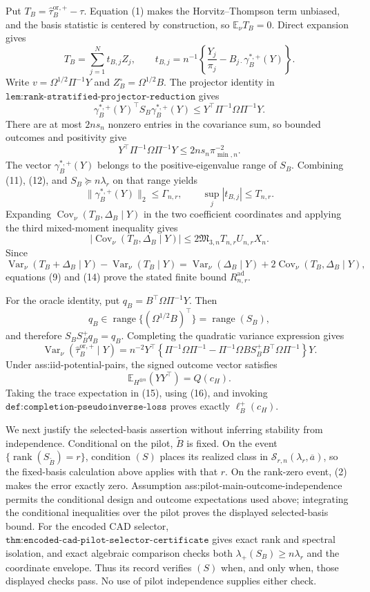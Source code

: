 Put \(T_B=\widehat\tau_B^{\mathrm{or},+}-\tau\).  Equation (1) makes the Horvitz--Thompson term unbiased, and the basis statistic is centered by construction, so \(\mathbb E_\nu T_B=0\).  Direct expansion gives
\[
T_B=\sum_{j=1}^{N}t_{B,j}Z_j,
\qquad
t_{B,j}=n^{-1}\left\{\frac{Y_j}{\pi_j}
-B_{j\cdot}\gamma_B^{*,+}(Y)\right\}.
\tag{10}
\]
Write \(v=\Omega^{1/2}\Pi^{-1}Y\) and \(Z_B^\circ=\Omega^{1/2}B\).  The projector identity in \(\texttt{lem:rank-stratified-projector-reduction}\) gives
\[
\gamma_B^{*,+}(Y)^{\top}S_B\gamma_B^{*,+}(Y)
\le Y^{\top}\Pi^{-1}\Omega\Pi^{-1}Y.
\tag{11}
\]
There are at most \(2ns_n\) nonzero entries in the covariance sum, so bounded outcomes and positivity give
\[
Y^{\top}\Pi^{-1}\Omega\Pi^{-1}Y
\le2ns_n\pi_{\min,n}^{-2}.
\tag{12}
\]
The vector \(\gamma_B^{*,+}(Y)\) belongs to the positive-eigenvalue range of \(S_B\).  Combining (11), (12), and \(S_B\succeq n\lambda_r\) on that range yields
\[
\lVert\gamma_B^{*,+}(Y)\rVert_2\le\Gamma_{n,r},
\qquad
\sup_j|t_{B,j}|\le T_{n,r}.
\tag{13}
\]
Expanding \(\operatorname{Cov}_\nu(T_B,\Delta_B\mid Y)\) in the two coefficient coordinates and applying the third mixed-moment inequality gives
\[
|\operatorname{Cov}_\nu(T_B,\Delta_B\mid Y)|
\le2\mathfrak M_{3,n}T_{n,r}U_{n,r}X_n.
\tag{14}
\]
Since
\[
\operatorname{Var}_\nu(T_B+\Delta_B\mid Y)-\operatorname{Var}_\nu(T_B\mid Y)
=\operatorname{Var}_\nu(\Delta_B\mid Y)
+2\operatorname{Cov}_\nu(T_B,\Delta_B\mid Y),
\]
equations (9) and (14) prove the stated finite bound \(R_{n,r}^{\mathrm{ad}}\).

For the oracle identity, put \(q_B=B^{\top}\Omega\Pi^{-1}Y\).  Then
\[
q_B\in\operatorname{range}\{(\Omega^{1/2}B)^{\top}\}
=\operatorname{range}(S_B),
\]
and therefore \(S_BS_B^+q_B=q_B\).  Completing the quadratic variance expression gives
\[
\operatorname{Var}_\nu(\widehat\tau_B^{\mathrm{or},+}\mid Y)
=n^{-2}Y^{\top}\left\{\Pi^{-1}\Omega\Pi^{-1}
-\Pi^{-1}\Omega B S_B^+B^{\top}\Omega\Pi^{-1}\right\}Y.
\tag{15}
\]
Under ass:iid-potential-pairs, the signed outcome vector satisfies
\[
\mathbb E_{H^{\otimes n}}(YY^{\top})=Q(c_H).
\tag{16}
\]
Taking the trace expectation in (15), using (16), and invoking \(\texttt{def:completion-pseudoinverse-loss}\) proves exactly \(\ell_B^+(c_H)\).

We next justify the selected-basis assertion without inferring stability from independence.  Conditional on the pilot, \(\widetilde B\) is fixed.  On the event \(\{\operatorname{rank}(S_{\widetilde B})=r\}\), condition \((S)\) places its realized class in \(\mathcal S_{r,n}(\lambda_r,\overline a)\), so the fixed-basis calculation above applies with that \(r\).  On the rank-zero event, (2) makes the error exactly zero.  Assumption ass:pilot-main-outcome-independence permits the conditional design and outcome expectations used above; integrating the conditional inequalities over the pilot proves the displayed selected-basis bound.  For the encoded CAD selector, \(\texttt{thm:encoded-cad-pilot-selector-certificate}\) gives exact rank and spectral isolation, and exact algebraic comparison checks both \(\lambda_+(S_B)\ge n\lambda_r\) and the coordinate envelope.  Thus its record verifies \((S)\) when, and only when, those displayed checks pass.  No use of pilot independence supplies either check.

